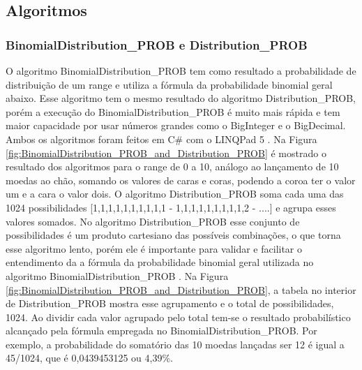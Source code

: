 \begin{apendicesenv}
\bigbreak\bigbreak
\chapter{Algoritmos}
\label{app:algoritmos}
\subsection*{BinomialDistribution\_PROB e Distribution\_PROB}
O algoritmo BinomialDistribution\_PROB tem como resultado a probabilidade de distribuição de um range e utiliza a fórmula  da probabilidade binomial geral abaixo. Esse algoritmo tem o mesmo resultado do algoritmo Distribution\_PROB, porém a execução do BinomialDistribution\_PROB é muito mais rápida e tem maior capacidade por usar números grandes como o BigInteger e o BigDecimal. Ambos os algoritmos foram feitos em C\# com o LINQPad 5 \footnotemark. Na Figura \ref{fig:BinomialDistribution_PROB_and_Distribution_PROB} é mostrado o resultado dos algoritmos para o range de 0 a 10, análogo ao lançamento de 10 moedas ao chão, somando os valores de caras e coras, podendo a coroa ter o valor um e a cara o valor dois. O algoritmo Distribution\_PROB soma cada uma das 1024 possibilidades [1,1,1,1,1,1,1,1,1,1 - 1,1,1,1,1,1,1,1,1,2 - ....] e agrupa esses valores somados. No algoritmo Distribution\_PROB esse conjunto de possibilidades é um produto cartesiano das possíveis combinações, o que torna esse algoritmo lento, porém ele é importante para validar e facilitar o entendimento da a fórmula da probabilidade binomial geral utilizada no algoritmo BinomialDistribution\_PROB \cite{mathisfun_binomial_distribution}. Na Figura \ref{fig:BinomialDistribution_PROB_and_Distribution_PROB}, a tabela no interior de  Distribution\_PROB mostra esse agrupamento e o total de possibilidades, 1024. Ao dividir cada valor agrupado pelo total tem-se o resultado probabilístico alcançado pela fórmula empregada no BinomialDistribution\_PROB. Por exemplo, a probabilidade do somatório das 10 moedas lançadas ser 12 é igual a 45/1024, que é 0,0439453125 ou 4,39\%.
	\begin{align*}

\end{align*}
\end{apendicesenv}
